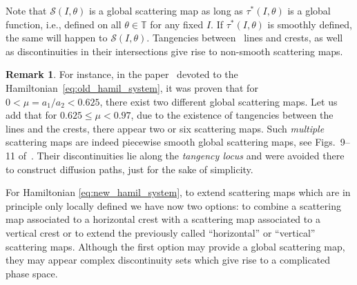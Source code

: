 \documentclass[a4paper,10pt]{article}
\newcommand{\NH}{\text{NHIM}}
\theoremstyle{definition}
\newtheorem{remark}[theorem]{Remark}
\begin{document}
Note that $\mathcal{S}(I,\theta)$ is a global scattering map as long as $\tau^*(I , \theta)$ is a global function, i.e., defined on all $\theta\in\mathbb{T}$ for any fixed $I$.
If $\tau^*(I,\theta)$ is smoothly defined, the same will happen to $\mathcal{S}(I,\theta)$.
Tangencies between \NH\, lines and crests, as well as discontinuities in their intersections give rise to non-smooth scattering maps.

\begin{remark}
For instance, in the paper~\cite{Delshams2017} devoted to the Hamiltonian~\eqref{eq:old_hamil_system},
it was proven that for $0<\mu=a_1/a_2<0.625$, there exist two different global scattering maps.
Let us add that for $0.625\leq \mu < 0.97$, due to the existence of tangencies between the {\NH} lines and the crests, there appear two or six scattering maps.
Such \emph{multiple} scattering maps are indeed piecewise smooth global scattering maps, see Figs.~9--11 of~\cite{Delshams2017}.
Their discontinuities lie along the \emph{tangency locus} and were avoided there to construct diffusion paths,
just for the sake of simplicity.
\end{remark}

For Hamiltonian \eqref{eq:new_hamil_system}, to extend scattering maps which are in principle only locally defined we have now two options: to combine a scattering map associated to a horizontal crest with a scattering map associated to a vertical crest or to extend the previously called ``horizontal'' or ``vertical'' scattering maps.
Although the first option may provide a global scattering map, they may appear complex discontinuity sets which give rise to a complicated phase space.
\end{document}
